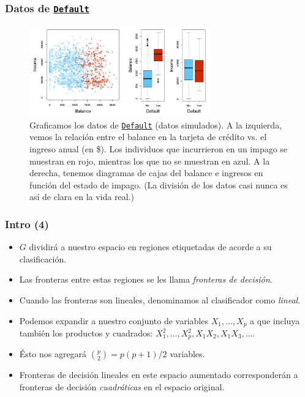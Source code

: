 \documentclass[usenames,dvipsnames]{beamer} %
\newcommand\vari[1]{\textcolor{BrickRed}{\texttt{#1}}}
\newcommand\defi[1]{\textcolor{NavyBlue}{\textit{#1}}}
\begin{document}
\begin{frame}\frametitle{Datos de \href{https://github.com/JWarmenhoven/ISLR-python/blob/master/Notebooks/Data/Default.xlsx}{\vari{Default}}}
    \begin{figure}
    \centering
        \includegraphics[width=0.70\textwidth]{images/islr/fig_4_1.png}
    \caption{Graficamos los datos de \href{https://github.com/JWarmenhoven/ISLR-python/blob/master/Notebooks/Data/Default.xlsx}{\vari{Default}} (datos simulados). A la izquierda, vemos la relaci\'on entre el balance en la tarjeta de cr\'edito vs. el ingreso anual (en \$). Los individuos que incurrieron en un impago se muestran en \textcolor{BrickRed}{rojo}, mientras los que no se muestran en \textcolor{Cerulean}{azul}. A la derecha, tenemos diagramas de cajas del balance e ingresos en funci\'on del estado de impago. (La divisi\'on de los datos casi nunca es as\'i de clara en la vida real.)}
    \label{fig:islr_4-1}
    \end{figure}
\end{frame}

\begin{frame}\frametitle{Intro (4)}
\begin{itemize}
	\item $G$ dividir\'a a nuestro espacio en regiones etiquetadas de acorde a su clasificaci\'on. 
	\item Las fronteras entre estas regiones se les llama \defi{fronteras de decisi\'on}.
	\item Cuando las fronteras son lineales, denominamos al clasificador como \defi{lineal}.
	\item Podemos expandir a nuestro conjunto de variables $X_1,\dotsc,X_p$ a que incluya tambi\'en los productos y cuadrados: $X_1^2,\dotsc, X_p^2, X_1 X_2, X_1 X_3, \dotsc$.
	\item \'Esto nos agregar\'a $\binom{p}{2}=p(p+1)/2$ variables.
	\item Fronteras de decisi\'on lineales en este espacio aumentado corresponder\'an a fronteras de decisi\'on \defi{cuadr\'aticas} en el espacio original.
\end{itemize}
\end{frame}
\end{document}
